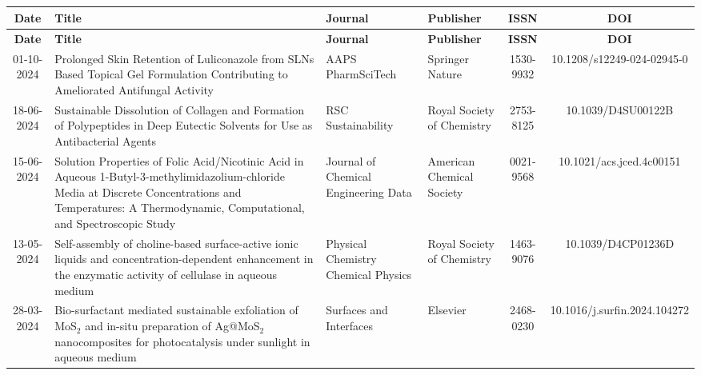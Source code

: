 \documentclass{article}
\begin{document}
\begin{landscape}
	\section*{}
	
	\begin{longtable}{|c|p{6cm}|p{3cm}|p{3cm}|c|c|}
		\hline
		\textbf{Date} & \textbf{Title} & \textbf{Journal} & \textbf{Publisher} & \textbf{ISSN} & \textbf{DOI} \\
		\hline
		\endfirsthead
		
		\hline
		\textbf{Date} & \textbf{Title} & \textbf{Journal} & \textbf{Publisher} & \textbf{ISSN} & \textbf{DOI} \\
		\hline
		\endhead
		
		01-10-2024 & Prolonged Skin Retention of Luliconazole from SLNs Based Topical Gel Formulation Contributing to Ameliorated Antifungal Activity & AAPS PharmSciTech & Springer Nature & 1530-9932 & 10.1208/s12249-024-02945-0 \\
		\hline
		
		18-06-2024 & Sustainable Dissolution of Collagen and Formation of Polypeptides in Deep Eutectic Solvents for Use as Antibacterial Agents & RSC Sustainability & Royal Society of Chemistry & 2753-8125 & 10.1039/D4SU00122B \\
		\hline
		
		15-06-2024 & Solution Properties of Folic Acid/Nicotinic Acid in Aqueous 1-Butyl-3-methylimidazolium-chloride Media at Discrete Concentrations and Temperatures: A Thermodynamic, Computational, and Spectroscopic Study & Journal of Chemical Engineering Data & American Chemical Society & 0021-9568 & 10.1021/acs.jced.4c00151 \\
		\hline
		
		13-05-2024 & Self-assembly of choline-based surface-active ionic liquids and concentration-dependent enhancement in the enzymatic activity of cellulase in aqueous medium & Physical Chemistry Chemical Physics & Royal Society of Chemistry & 1463-9076 & 10.1039/D4CP01236D \\
		\hline
		
		28-03-2024 & Bio-surfactant mediated sustainable exfoliation of MoS$_2$ and in-situ preparation of Ag@MoS$_2$ nanocomposites for photocatalysis under sunlight in aqueous medium & Surfaces and Interfaces & Elsevier & 2468-0230 & 10.1016/j.surfin.2024.104272 \\
		\hline
		

\end{longtable}
\end{landscape}
\end{document}
